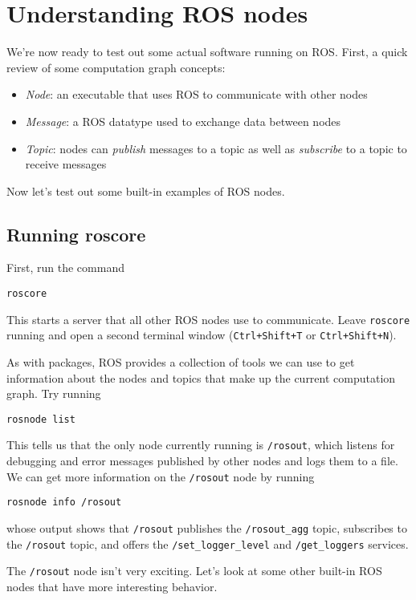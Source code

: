 \documentclass{article}
\begin{document}
\pagebreak

\section{Understanding ROS nodes}
We're now ready to test out some actual software running on ROS. First, a quick review of some computation graph concepts:
\begin{itemize}
\item \emph{Node}: an executable that uses ROS to communicate with other nodes
\item \emph{Message}: a ROS datatype used to exchange data between nodes
\item \emph{Topic}: nodes can \emph{publish} messages to a topic as well as \emph{subscribe} to a topic to receive messages
\end{itemize}

Now let's test out some built-in examples of ROS nodes.

\subsection{Running roscore}
First, run the command
\begin{Verbatim}[frame=single]
roscore
\end{Verbatim}
This starts a server that all other ROS nodes use to communicate. Leave \verb=roscore= running and open a second terminal window (\verb=Ctrl+Shift+T= or \verb=Ctrl+Shift+N=).

As with packages, ROS provides a collection of tools we can use to get information about the nodes and topics that make up the current computation graph. Try running
\begin{Verbatim}[frame=single]
rosnode list
\end{Verbatim}
This tells us that the only node currently running is \verb=/rosout=, which listens for debugging and error messages published by other nodes and logs them to a file. We can get more information on the \verb=/rosout= node by running
\begin{Verbatim}[frame=single]
rosnode info /rosout
\end{Verbatim}
whose output shows that \verb=/rosout= publishes the \verb=/rosout_agg= topic, subscribes to the \verb=/rosout= topic, and offers the \verb=/set_logger_level= and \verb=/get_loggers= services.

The \verb=/rosout= node isn't very exciting. Let's look at some other built-in ROS nodes that have more interesting behavior.
\end{document}
